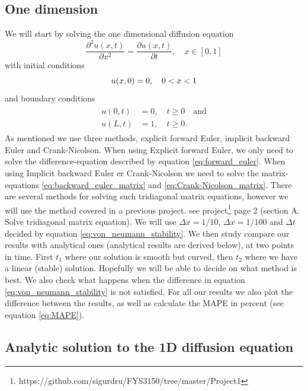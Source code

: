 \documentclass[reprint, english,notitlepage,nofootinbib]{revtex4-1}  %
\begin{document}
\subsection{One dimension}
We will start by solving the one dimensional diffusion equation
\begin{equation*}
  \frac{\partial^2 u(x,t)}{\partial x^2} = \frac{\partial u(x,t)}{\partial t}, \quad x \in [0, 1]
\end{equation*}
with initial conditions
\begin{equation}
	\label{eq:1D_init}
  u(x, 0) = 0, \quad 0<x<1\\
\end{equation}
and boundary conditions
\begin{align}
	\label{eq:1D_bound}
	\begin{split}
  u(0, t) &= 0, \quad t \ge 0 \quad \text{and} \\
  u(L, t) &= 1, \quad t \ge 0.
  \end{split}
\end{align}
As mentioned we use three methods, explicit forward Euler, implicit backward Euler and Crank-Nicolson. When using Explicit forward Euler, we only need to solve the difference-equation described by equation \eqref{eq:forward_euler}. When using Implicit backward Euler er Crank-Nicolson we need to solve the matrix-equations \eqref{eq:backward_euler_matrix} and \eqref{eq:Crank-Nicolson_matrix}. There are several methods for solving such tridiagonal matrix equations, however we will use the method covered in a previous project. see project\footnote{https://github.com/sigurdru/FYS3150/tree/master/Project1} page 2 (section A. Solve tridiagonal matrix equation). We will use $\Delta x = 1/10$, $\Delta x = 1/100$ and $\Delta t$ decided by equation \eqref{eq:von_neumann_stability}. We then study compare our results with analytical ones (analytical results are derived below), at two points in time. First $t_1$ where our solution is smooth but curved, then $t_2$ where we have a linear (stable) solution. Hopefully we will be able to decide on what method is best. We also check what happens when the difference in equation \eqref{eq:von_neumann_stability} is not satisfied. For all our results we also plot the difference between the results, as well as calculate the MAPE in percent (see equation \eqref{eq:MAPE}).

\subsection*{Analytic solution to the 1D diffusion equation}
\end{document}
